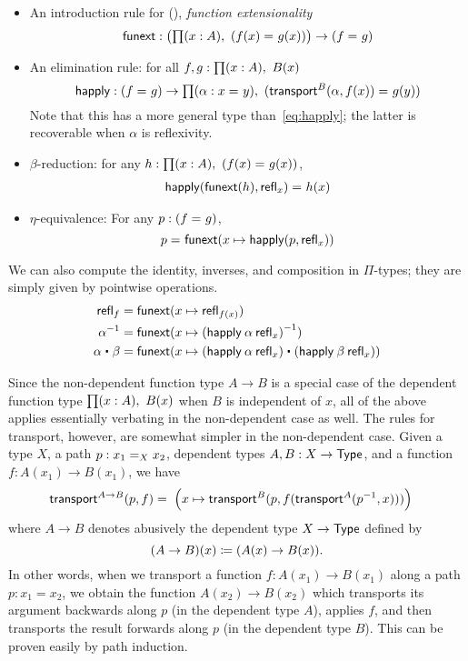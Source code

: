 \begin{itemize}
\item An introduction rule for {()}, \emph{function extensionality}
  \[
  \funext : \big(\prd{x:A} (\id{f(x)}{g(x)})\big) \to {(\id{f}{g})}
  \]
\item An elimination rule: for all $f,g : \prd{x:A} B(x)$
  \[
  \happly : (\id{f}{g}) \to \prd{\alpha : \id{x}{y}} (\id{\transfib{B}{\alpha}{f(x)}}{g(y)})
  \]
  Note that this has a more general type than~\eqref{eq:happly}; the latter is recoverable when $\alpha$ is reflexivity.
\item $\beta$-reduction: for any $h:\prd{x:A} (\id{f(x)}{g(x)})$,
  \[
  \begin{array}{l}
  \id{\happly({\funext{(h)}},{\refl{x}})}{h(x)}
  \end{array}
  \]
\item $\eta$-equivalence: For any $p: (\id f g)$,
  \[
  \id{p}{\funext (x \mapsto \happly(p,\refl{x}))}
  \]
\end{itemize}

We can also compute the identity, inverses, and composition in $\Pi$-types; they are simply given by pointwise operations.
\begin{align*}
\refl{f} &= \funext(x \mapsto \refl{f(x)}) \\
\opp{\alpha} &= \funext (x \mapsto \opp{(\happly \: {\alpha} \: {\refl x})})  \\
{\alpha} \ct \beta &= \funext (x \mapsto {(\happly \: {\alpha} \: {\refl x}) \ct (\happly \: {\beta} \: {\refl x})})
\end{align*}

Since the non-dependent function type $A\to B$ is a special case of the dependent function type $\prd{x:A} B(x)$ when $B$ is independent of $x$, all of the above applies essentially verbating in the non-dependent case as well.
The rules for transport, however, are somewhat simpler in the non-dependent case.
Given a type $X$, a path $p:\id[X]{x_1}{x_2}$, dependent types $A,B:X\to \type$, and a function $f : A(x_1) \to B(x_1)$,  we have
\begin{align*}
  \transfib{A\to B}{p}{f} &=
  \; \Big(x \mapsto \transfib{B}{p}{f(\transfib{A}{\opp p}{x})}\Big)
\end{align*}
where $A\to B$ denotes abusively the dependent type $X\to \type$ defined by
\[(A\to B)(x) \defeq (A(x)\to B(x)).\]
In other words, when we transport a function $f:A(x_1)\to B(x_1)$ along a path $p:x_1=x_2$, we obtain the function $A(x_2)\to B(x_2)$ which transports its argument backwards along $p$ (in the dependent type $A$), applies $f$, and then transports the result forwards along $p$ (in the dependent type $B$).
This can be proven easily by path induction.

